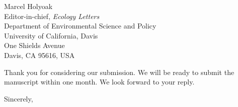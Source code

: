 \documentclass[11pt]{letter}
\makeatletter
\renewcommand{\closing}[1]{\par\nobreak\vspace{\parskip}%
  \stopbreaks
  \noindent
  \ifx\@empty\fromaddress\else
  \hspace*{\longindentation}\fi
  \parbox{\indentedwidth}{\raggedright
       \ignorespaces #1\\[1\medskipamount]%
       \ifx\@empty\fromsig
           \fromname
       \else \fromsig \fi\strut}%
   \par}
\makeatother
\begin{document}
\begin{letter}{Marcel Holyoak \\ 
	Editor-in-chief, \emph{Ecology Letters} \\ 
	Department of Environmental Science and Policy \\
	University of California, Davis \\
	One Shields Avenue \\
	Davis, CA 95616, USA }


Thank you for considering our submission. We will be ready to submit the manuscript within one month. We look forward to your reply.

\closing{Sincerely,}

\end{letter}
\end{document}
